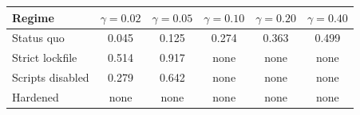 \begin{tabular}{lccccc}
\toprule
Regime & $\gamma=0.02$ & $\gamma=0.05$ & $\gamma=0.10$ & $\gamma=0.20$ & $\gamma=0.40$ \\
\midrule
Status quo & 0.045 & 0.125 & 0.274 & 0.363 & 0.499 \\
Strict lockfile & 0.514 & 0.917 & none & none & none \\
Scripts disabled & 0.279 & 0.642 & none & none & none \\
Hardened & none & none & none & none & none \\
\bottomrule
\end{tabular}
